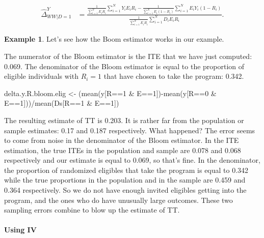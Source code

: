 \documentclass[
]{book}
\newenvironment{Shaded}{\begin{snugshade}}{\end{snugshade}}
\newcommand{\DecValTok}[1]{\textcolor[rgb]{0.00,0.00,0.81}{#1}}
\newcommand{\FunctionTok}[1]{\textcolor[rgb]{0.00,0.00,0.00}{#1}}
\newcommand{\NormalTok}[1]{#1}
\newcommand{\OtherTok}[1]{\textcolor[rgb]{0.56,0.35,0.01}{#1}}
\newcommand{\SpecialCharTok}[1]{\textcolor[rgb]{0.00,0.00,0.00}{#1}}
\theoremstyle{definition}
\theoremstyle{definition}
\newtheorem{example}{Example}[chapter]
\theoremstyle{definition}
\theoremstyle{definition}
\theoremstyle{remark}
\begin{document}
\begin{align*}
  \hat{\Delta}^Y_{WW|D=1} & = \frac{\frac{1}{\sum_{i=1}^N E_iR_i}\sum_{i=1}^N Y_iE_iR_i-\frac{1}{\sum_{i=1}^N E_i(1-R_i)}\sum_{i=1}^N E_iY_i(1-R_i)}{\frac{1}{\sum_{i=1}^N E_iR_i}\sum_{i=1}^N D_iE_iR_i}.
\end{align*}

\begin{example}
\protect\hypertarget{exm:unnamed-chunk-97}{}{\label{exm:unnamed-chunk-97} }Let's see how the Boom estimator works in our example.
\end{example}
The numerator of the Bloom estimator is the ITE that we have just computed: 0.069.
The denominator of the Bloom estimator is equal to the proportion of eligible individuals with \(R_i=1\) that have chosen to take the program: 0.342.

\begin{Shaded}
\begin{Highlighting}[]
\NormalTok{delta.y.R.bloom.elig }\OtherTok{\textless{}{-}}\NormalTok{ (}\FunctionTok{mean}\NormalTok{(y[R}\SpecialCharTok{==}\DecValTok{1} \SpecialCharTok{\&}\NormalTok{ E}\SpecialCharTok{==}\DecValTok{1}\NormalTok{])}\SpecialCharTok{{-}}\FunctionTok{mean}\NormalTok{(y[R}\SpecialCharTok{==}\DecValTok{0} \SpecialCharTok{\&}\NormalTok{ E}\SpecialCharTok{==}\DecValTok{1}\NormalTok{]))}\SpecialCharTok{/}\FunctionTok{mean}\NormalTok{(Ds[R}\SpecialCharTok{==}\DecValTok{1} \SpecialCharTok{\&}\NormalTok{ E}\SpecialCharTok{==}\DecValTok{1}\NormalTok{])}
\end{Highlighting}
\end{Shaded}

The resulting estimate of TT is 0.203.
It is rather far from the population or sample estimates: 0.17 and 0.187 respectively.
What happened?
The error seems to come from noise in the denominator of the Bloom estimator.
In the ITE estimation, the true ITEs in the population and sample are 0.078 and 0.068 respectively and our estimate is equal to 0.069, so that's fine.
In the denominator, the proportion of randomized eligibles that take the program is equal to 0.342 while the true proportions in the population and in the sample are 0.459 and 0.364 respectively.
So we do not have enough invited eligibles getting into the program, and the ones who do have unusually large outcomes.
These two sampling errors combine to blow up the estimate of TT.

\hypertarget{using-iv}{%
\paragraph{Using IV}\label{using-iv}}
\end{document}
